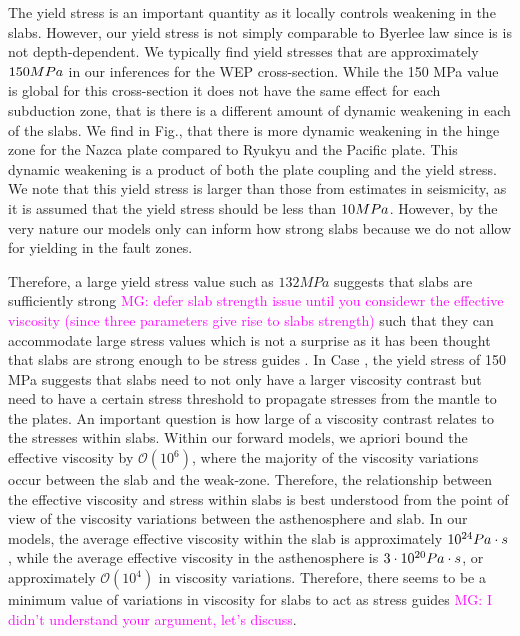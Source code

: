 \documentclass[12pt]{article}
\newcommand{\mgnote}[1]{\textcolor{magenta}{MG: #1}}
\begin{document}
{  The yield stress is an important quantity as it locally controls weakening in the slabs. However, our yield stress is not simply comparable to Byerlee law since is is not depth-dependent. We typically find yield stresses that are approximately $150 \space MPa$ in our inferences for the WEP cross-section. While the 150 MPa value is global for this cross-section it does not have the same effect for each subduction zone, that is there is a different amount of dynamic weakening in each of the slabs. We find in Fig., that there is more dynamic weakening in the hinge zone for the Nazca plate compared to Ryukyu and the Pacific plate. This dynamic weakening is a product of both the plate coupling and the yield stress. We note that this yield stress is larger than those from estimates in seismicity, as it is assumed that the yield stress should be less than $10 \space MPa$. However, by the very nature our models only can inform how strong slabs because we do not allow for yielding in the fault zones.
  
  Therefore, a large yield stress value such as $132 MPa$ suggests that slabs are sufficiently strong \mgnote{defer slab strength issue until you considewr the effective viscosity (since three parameters give rise to slabs strength)} such that they can accommodate large stress values which is not a surprise as it has been thought that slabs are strong enough to be stress guides \citep{Stadler27082010}. In Case , the yield stress of 150 MPa suggests that slabs need to not only have a larger viscosity contrast but need to have a certain stress threshold to propagate stresses from the mantle to the plates. An important question is how large of a viscosity contrast relates to the stresses within slabs. Within our forward models, we apriori bound the effective viscosity by $\mathcal{O}(10^6)$, where the majority of the viscosity variations occur between the slab and the weak-zone. Therefore, the relationship between the effective viscosity and stress within slabs is best understood from the point of view of the viscosity variations between the asthenosphere and slab. In our models, the average effective viscosity within the slab is approximately $10^{24}\space Pa\cdot s$, while the average effective viscosity in the asthenosphere is $3\cdot 10^{20}\space Pa\cdot s$, or approximately $\mathcal{O}(10^4)$ in viscosity variations. Therefore, there seems to be a minimum value of variations in viscosity for slabs to act as stress guides \mgnote{I didn't understand your argument, let's discuss}.   

}
\end{document}

